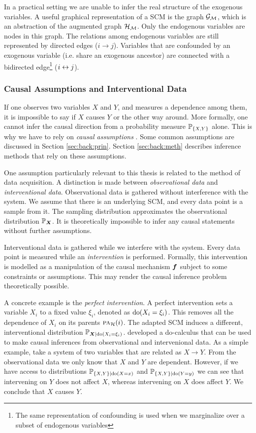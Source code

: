 In a practical setting we are unable to infer the real structure of the exogenous variables. A useful graphical representation of a SCM is the graph $\mathcal{G}_{\mathcal{M}}$, which is an abstraction of the augmented graph $\mathcal{H}_{\mathcal{M}}$. Only the endogenous variables are nodes in this graph. The relations among endogenous variables are still represented by directed edges ($i \to j$). Variables that are confounded by an exogenous variable (i.e. share an exogenous ancestor) are connected with a bidirected edge\footnote{The same representation of confounding is used when we marginalize over a subset of endogenous variables} ($i\leftrightarrow j$).

\subsubsection{Causal Assumptions and Interventional Data}
If one observes two variables $X$ and $Y$, and measures a dependence among them, it is impossible to say if $X$ causes $Y$ or the other way around. More formally, one cannot infer the causal direction from a probability measure $\mathbb{P}_{\{X,Y\}}$ alone. This is why we have to rely on \textit{causal assumptions} \citep{pearl2009causality}. Some common assumptions are discussed in Section \ref{sec:back:prin}. Section \ref{sec:back:meth} describes inference methods that rely on these assumptions. 

One assumption particularly relevant to this thesis is related to the method of data acquisition. A distinction is made between \textit{observational data} and \textit{interventional data}. Observational data is gathered without interference with the system. We assume that there is an underlying SCM, and every data point is a sample from it. The sampling distribution approximates the observational distribution $\mathbb{P}_{\bm{X}}$. It is theoretically impossible to infer any causal statements without further assumptions. 

Interventional data is gathered while we interfere with the system. Every data point is measured while an \textit{intervention} is performed. Formally, this intervention is modelled as a manipulation of the causal mechanism $\bm{f}$ subject to some constraints or assumptions. This may render the causal inference problem theoretically possible. 

A concrete example is the \textit{perfect intervention}. A perfect intervention sets a variable $X_i$ to a fixed value $\xi_i$, denoted as $\mathrm{do}(X_i=\xi_i)$. This removes all the dependence of $X_i$ on its parents $\text{\normalfont\scshape pa}_{\mathcal{H}}(i)$. The adapted SCM induces a different, interventional distribution $\mathbb{P}_{\bm{X}|\mathrm{do}(X_i=\xi_i)}$. \citet{pearl2009causality} developed a do-calculus that can be used to make causal inferences from observational and intervenional data. As a simple example, take a system of two variables that are related as $X\to Y$. From the observational data we only know that $X$ and $Y$ are dependent. However, if we have access to distributions $\mathbb{P}_{\{X,Y\}|\mathrm{do}(X=x)}$ and $\mathbb{P}_{\{X,Y\}|\mathrm{do}(Y=y)}$ we can see that intervening on $Y$ does not affect $X$, whereas intervening on $X$ does affect $Y$. We conclude that $X$ causes $Y$. 


